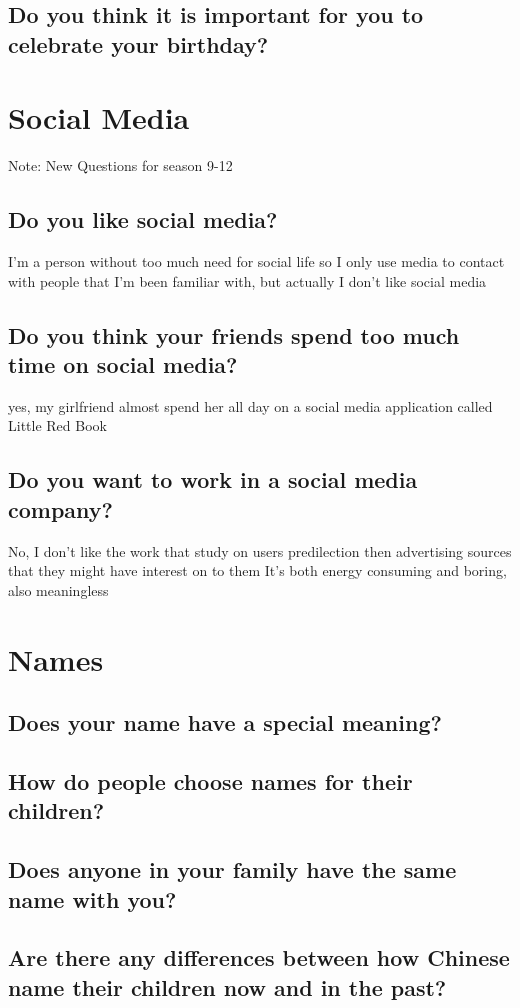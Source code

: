 \documentclass[conference]{IEEEtran}
\begin{document}
\subsection{Do you think it is important for you to celebrate your birthday?}

\section{Social Media}
Note: New Questions for season 9-12
\subsection{Do you like social media?}
I'm a person without too much need for social life
so I only use media to contact with people that I'm been
familiar with, but actually I don't like social media
\subsection{Do you think your friends spend too much time on social media?}
yes, my girlfriend almost spend her all day on a social media application
called Little Red Book
\subsection{Do you want to work in a social media company?}
No, I don't like the work that study on users predilection then
advertising sources that they might have interest on to them
It's both energy consuming and boring, also meaningless

\section{Names}
\subsection{Does your name have a special meaning?}
\subsection{How do people choose names for their children?}
\subsection{Does anyone in your family have the same name with you?}
\subsection{Are there any differences between how Chinese name their
children now and in the past?}
\end{document}
